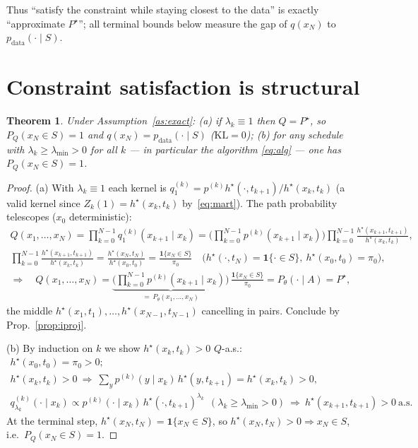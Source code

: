 \documentclass[11pt]{article}
\newcommand{\KL}{\mathrm{KL}}
\newcommand{\hs}{h^\star}
\newcommand{\lmin}{\lambda_{\min}}
\theoremstyle{plain}
\newtheorem{theorem}{Theorem}
\theoremstyle{definition}
\theoremstyle{remark}
\begin{document}
Thus ``satisfy the constraint while staying closest to the data'' is exactly
``approximate $P^\star$''; all terminal bounds below measure the gap of $q(x_N)$
to $p_{\text{data}}(\cdot\mid S)$.

\section{Constraint satisfaction is structural}
\label{sec:sat}

\begin{theorem}
\label{thm:sat}
Under Assumption~\ref{as:exact}:
\textup{(a)} if $\lambda_k\equiv1$ then $Q=P^\star$, so $P_Q(x_N\in S)=1$ and
$q(x_N)=p_{\text{data}}(\cdot\mid S)$ ($\KL=0$);
\textup{(b)} for \emph{any} schedule with $\lambda_k\ge\lmin>0$ for all $k$ --- in
particular the algorithm \eqref{eq:alg} --- one has $P_Q(x_N\in S)=1$.
\end{theorem}
\begin{proof}
\textup{(a)} With $\lambda_k\equiv1$ each kernel is $q^{(k)}_1=p^{(k)}\hs(\cdot,t_{k+1})/\hs(x_k,t_k)$
(a valid kernel since $Z_k(1)=\hs(x_k,t_k)$ by~\eqref{eq:mart}). The path
probability telescopes ($x_0$ deterministic):
\begin{gather*}
Q(x_1,\dots,x_N)=\prod_{k=0}^{N-1} q^{(k)}_1(x_{k+1}\mid x_k)
=\Big(\textstyle\prod_{k=0}^{N-1} p^{(k)}(x_{k+1}\mid x_k)\Big)\prod_{k=0}^{N-1}\frac{\hs(x_{k+1},t_{k+1})}{\hs(x_k,t_k)},\\
\prod_{k=0}^{N-1}\frac{\hs(x_{k+1},t_{k+1})}{\hs(x_k,t_k)}
=\frac{\hs(x_N,t_N)}{\hs(x_0,t_0)}=\frac{\mathbf 1\{x_N\in S\}}{\pi_0}
\quad\big(\hs(\cdot,t_N)=\mathbf 1\{\cdot\in S\},\ \hs(x_0,t_0)=\pi_0\big),\\
\Longrightarrow\quad
Q(x_1,\dots,x_N)=\underbrace{\Big(\textstyle\prod_{k=0}^{N-1} p^{(k)}(x_{k+1}\mid x_k)\Big)}_{=\,P_\theta(x_1,\dots,x_N)}
\,\frac{\mathbf 1\{x_N\in S\}}{\pi_0}=P_\theta(\cdot\mid A)=P^\star,
\end{gather*}
the middle $\hs(x_1,t_1),\dots,\hs(x_{N-1},t_{N-1})$ cancelling in pairs. Conclude by Prop.~\ref{prop:iproj}.

\textup{(b)} By induction on $k$ we show $\hs(x_k,t_k)>0$ $Q$-a.s.:
\begin{gather*}
\hs(x_0,t_0)=\pi_0>0;\\
\hs(x_k,t_k)>0\ \Longrightarrow\ \textstyle\sum_y p^{(k)}(y\mid x_k)\,\hs(y,t_{k+1})=\hs(x_k,t_k)>0,\\
q^{(k)}_{\lambda_k}(\cdot\mid x_k)\propto p^{(k)}(\cdot\mid x_k)\,\hs(\cdot,t_{k+1})^{\lambda_k}\ \ (\lambda_k\ge\lmin>0)
\ \Longrightarrow\ \hs(x_{k+1},t_{k+1})>0\ \text{a.s.}
\end{gather*}
At the terminal step, $\hs(x_N,t_N)=\mathbf 1\{x_N\in S\}$, so $\hs(x_N,t_N)>0\Rightarrow x_N\in S$, i.e.\ $P_Q(x_N\in S)=1$.
\end{proof}
\end{document}
